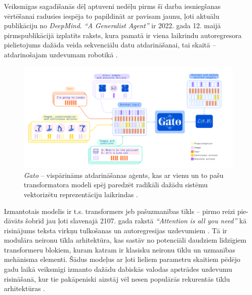 \documentclass[12pt, a4paper]{article}
\numberwithin{equation}{section} %
\begin{document}
Veiksmīgas sagadīšanās dēļ aptuveni nedēļu pirms šī darba iesniegšanas vērtēšanai radusies iespēja to papildināt ar pavisam jaunu, ļoti aktuālu publikāciju no \textit{DeepMind}. \textit{``A Generalist Agent''} ir 2022. gada 12. maijā pirmspublikācijā izplatīts raksts, kura pamatā ir viena laikrindu autoregresora pielietojums dažāda veida sekvenciālu datu atdarināšanai, tai skaitā -- atdarinošajam uzdevumam robotikā \cite{reed2022generalist}.

\begin{figure}[t!]
    \centering
    \includegraphics[width=16cm,page=1]{../img/gato.png}
    \caption{\textit{Gato} -- vispārināms atdarināšanas aģents, kas ar vienu un to pašu transformatora modeli spēj paredzēt radikāli dažādu sistēmu vektorizētu reprezentāciju laikrindas \cite{reed2022generalist}.}
\end{figure}

Izmantotais modelis ir t.s. transformers jeb pašuzmanības tīkls -- pirmo reizi pie-dāvāts šobrīd jau ļoti slavenajā 2107. gada rakstā \textit{``Attention is all you need''} kā risinājums teksta virkņu tulkošanas un autoregresijas uzdevumiem \cite{vaswani2017attention}. Tā ir modulāra neironu tīkla arhitektūra, kas sastāv no potenciāli daudziem līdzīgiem transformeru blokiem, kuram katram ir klasisku neironu tīklu un uzmanības mehānisma elementi. Šādus modeļus ar ļoti lieliem parametru skaitiem pēdējo gadu laikā veiksmīgi izmanto dažādu dabiskās valodas apstrādes uzdevumu risināšanā, kur tie pakāpeniski aizstāj vēl nesen populārās rekurentās tīklu arhitektūras \cite{radford2018improving}.
\end{document}
